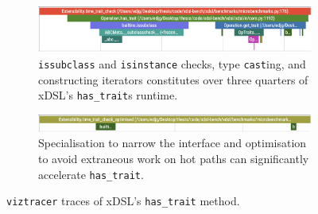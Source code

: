 \begin{figure}[H]
    \centering
    \begin{subfigure}[b]{\textwidth}
        \centering
        \includegraphics[width=\textwidth]{images/specialising_optimising_xdsl_rewriting/original_hastrait.png}
        \captionsetup{width=0.8\textwidth}
        \caption{\texttt{issubclass} and \texttt{isinstance} checks, type \texttt{cast}ing, and constructing iterators constitutes over three quarters of xDSL's \texttt{has_trait}s runtime.}
        \label{fig:ubenchmark-hastrait-original-viztracer}
    \end{subfigure}
    \begin{subfigure}[b]{\textwidth}
        \centering
        \includegraphics[width=\textwidth]{images/specialising_optimising_xdsl_rewriting/optimised_hastrait.png}
        \captionsetup{width=0.8\textwidth}
        \caption{Specialisation to narrow the interface and optimisation to avoid extraneous work on hot paths can significantly accelerate \texttt{has_trait}.}
        \label{fig:ubenchmark-hastrait-optimised-viztracer}
    \end{subfigure}
    \caption{\texttt{viztracer} traces of xDSL's \texttt{has_trait} method.}
    \label{fig:ubenchmark-hastrait-viztracer}
\end{figure}



